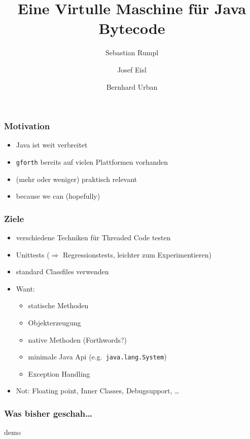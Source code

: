 \documentclass{beamer}
\title[Stackbasierte Programmiersprachen (WS2011)]{Eine Virtulle Maschine f\"ur Java Bytecode}
\author{Sebastian Rumpl \and Josef Eisl \and Bernhard Urban}
\begin{document}
\frame{\titlepage}
\begin{frame}
	\frametitle{Motivation}
	\begin{itemize}
		\item Java ist weit verbreitet
		\item \texttt{gforth} bereits auf vielen Plattformen vorhanden
		\item (mehr oder weniger) praktisch relevant
		\pause\item because we can (hopefully)
	\end{itemize}
\end{frame}
\begin{frame}
	\frametitle{Ziele}
	\begin{itemize}
		\item verschiedene Techniken f\"ur Threaded Code testen
		\item Unittests ($\Rightarrow$ Regressionstests, leichter zum
		Experimentieren)
		\item standard Classfiles verwenden
		\item Want:
		\begin{itemize}
			\item statische Methoden
			\item Objekterzeugung
			\item native Methoden (Forthwords?)
			\item minimale Java Api (e.g.\ \texttt{java.lang.System})
			\item Exception Handling
		\end{itemize}
		\item Not: Floating point, Inner Classes, Debugsupport, \dots
	\end{itemize}
\end{frame}
\begin{frame}
	\frametitle{Was bisher geschah\dots}
	\begin{center}
		demo
	\end{center}
\end{frame}
\end{document}
